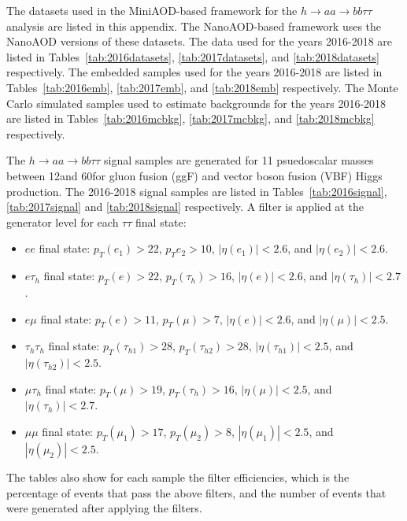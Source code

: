 The datasets used in the MiniAOD-based framework for the $h \rightarrow aa \rightarrow bb\tau\tau$ analysis are listed in this appendix. The NanoAOD-based framework uses the NanoAOD versions of these datasets. The data used for the years 2016-2018 are listed in Tables~\ref{tab:2016datasets}, \ref{tab:2017datasets}, and \ref{tab:2018datasets} respectively. The embedded samples used for the years 2016-2018 are listed in Tables~\ref{tab:2016emb}, \ref{tab:2017emb}, and \ref{tab:2018emb} respectively. The Monte Carlo simulated samples used to estimate backgrounds for the years 2016-2018 are listed in Tables~\ref{tab:2016mcbkg}, \ref{tab:2017mcbkg}, and \ref{tab:2018mcbkg} respectively. 

The $h \rightarrow aa \rightarrow bb\tau\tau$ signal samples are generated for 11 psuedoscalar masses between 12\GeV and 60\GeV for gluon fusion (ggF) and vector boson fusion (VBF) Higgs production. The 2016-2018 signal samples are listed in Tables~\ref{tab:2016signal}, \ref{tab:2017signal} and \ref{tab:2018signal} respectively. A filter is applied at the generator level for each $\tau\tau$ final state:
\begin{itemize}
    \item $ee$ final state: $p_{T}(e_1) > 22$\GeV, $p_{T}e_{2} > 10$\GeV, $|\eta(e_{1})| < 2.6$, and $|\eta(e_{2})| < 2.6$.
    \item $e\tau_{h}$ final state: $p_{T}(e) > 22$\GeV, $p_{T}(\tau_{h}) > 16$\GeV, $|\eta(e)| < 2.6$, and $|\eta(\tau_{h})| < 2.7$.
    \item $e\mu$ final state: $p_{T}(e) > 11$\GeV, $p_{T}(\mu) > 7$\GeV, $|\eta(e)| < 2.6$, and $|\eta(\mu)| < 2.5$.
    \item $\tau_{h}\tau_{h}$ final state: $p_{T}(\tau_{h1}) > 28$\GeV, $p_{T}(\tau_{h2}) > 28$\GeV, $|\eta(\tau_{h1})| < 2.5$, and $|\eta(\tau_{h2})| < 2.5$.
    \item $\mu\tau_{h}$ final state: $p_{T}(\mu) > 19$\GeV, $p_{T}(\tau_{h}) > 16$\GeV, $|\eta(\mu)| < 2.5$, and $|\eta(\tau_{h})| < 2.7$.
    \item $\mu\mu$ final state: $p_{T}(\mu_{1}) > 17$\GeV, $p_{T}(\mu_{2}) > 8$\GeV, $|\eta(\mu_{1})| < 2.5$, and $|\eta(\mu_{2})| < 2.5$.
\end{itemize}
The tables also show for each sample the filter efficiencies, which is the percentage of events that pass the above filters, and the number of events that were generated after applying the filters.


